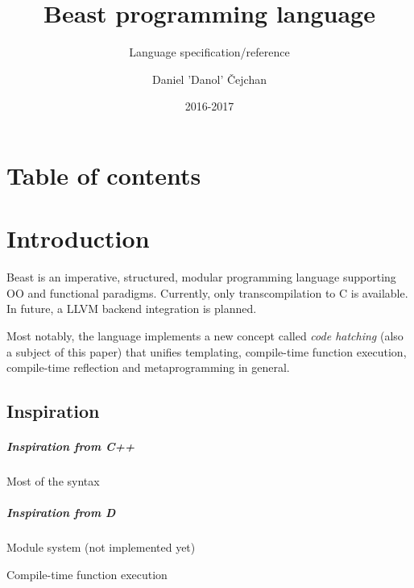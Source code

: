 




\setlength\extrarowheight{2pt}

\title{Beast programming language}
\subtitle{Language specification/reference}
\author{Daniel 'Danol' Čejchan}
\date{2016-2017}



\mainpage

\chapter{Table of contents}
\makeatletter
\setcounter{tocdepth}{1}
\makeatother

\chapter{Introduction}
Beast is an imperative, structured, modular programming language supporting OO and functional paradigms. Currently, only transcompilation to C is available. In future, a LLVM backend integration is planned.

Most notably, the language implements a new concept called \textit{code hatching} (also a subject of this paper) that unifies templating, compile-time function execution, compile-time reflection and metaprogramming in general.

\section{Inspiration}
\paragraph{Inspiration from C++}
\begin{compactitem}
	\item Most of the syntax
\end{compactitem}

\paragraph{Inspiration from D}
\begin{compactitem}
	\item Module system (not implemented yet)
	\item Compile-time function execution
\end{compactitem}


